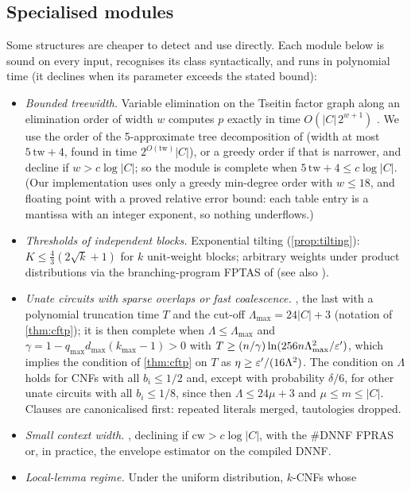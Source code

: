 \subsection{Specialised modules}\label{sec:modules}

Some structures are cheaper to detect and use directly. Each module below is
sound on every input, recognises its class syntactically, and runs in polynomial
time (it declines when its parameter exceeds the stated bound):
\begin{itemize}
\item \emph{Bounded treewidth.} Variable elimination on the Tseitin factor graph
along an elimination order of width $w$ computes $p$ exactly in time
$O(|C|\,2^{w+1})$ \cite{darwiche2009,samer2010}. We use the order of the
5-approximate tree decomposition of \cite{bodlaender2016} (width at most
$5\,\mathrm{tw}+4$, found in time $2^{O(\mathrm{tw})}|C|$), or a greedy order if
that is narrower, and decline if $w>c\log|C|$; so the module is complete when
$5\,\mathrm{tw}+4\le c\log|C|$. (Our implementation uses only a greedy min-degree order
with $w\le18$, and floating point with a proved relative error bound: each table entry
is a mantissa with an integer exponent, so nothing underflows.)
\item \emph{Thresholds of independent blocks.} Exponential tilting
(\cref{prop:tilting}): $K\le\frac43(2\sqrt k+1)$ for $k$ unit-weight blocks;
arbitrary weights under product distributions via the branching-program FPTAS of
\cite{gkm2010} (see also \cite{gopalan2011fptas}).
\item \emph{Unate circuits with sparse overlaps or fast coalescence.}
, the last with a polynomial
truncation time $T$ and the cut-off $\Lambda_{\max}=24|C|+3$ (notation of
\cref{thm:cftp}); it is then complete when $\Lambda\le\Lambda_{\max}$ and
$\gamma=1-q_{\max}d_{\max}(k_{\max}-1)>0$ with
$T\ge(n/\gamma)\ln(256n\Lambda_{\max}^2/\varepsilon')$, which implies the condition of
\cref{thm:cftp} on $T$ as $\eta\ge\varepsilon'/(16\Lambda^2)$. The condition on $\Lambda$
holds for CNFs with all $b_i\le1/2$ and, except with probability $\delta/6$, for
other unate circuits with all $b_i\le1/8$, since then $\Lambda\le24\mu+3$ and
$\mu\le m\le|C|$. Clauses are canonicalised first: repeated literals merged,
tautologies dropped.
\item \emph{Small context width.} , declining if
$\mathrm{cw}>c\log|C|$, with the \#DNNF FPRAS or, in practice, the envelope
estimator on the compiled DNNF.
\item \emph{Local-lemma regime.} Under the uniform distribution, $k$-CNFs whose

\end{itemize}
